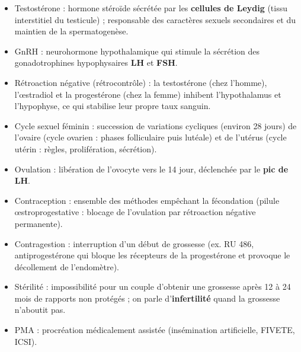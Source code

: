 \documentclass[11pt]{article}
\newcommand{\cle}[1]{{\popxbold\color{popdark}#1}}
\newcounter{popsec}
\newcounter{popsub}
\newcommand{\courssub}[1]{%
  \stepcounter{popsub}%
  \par\vspace{9pt}\noindent{\popxbold\fontsize{11.5}{13}\selectfont\color{popink}{\color{poporange}\thepopsec.\thepopsub}\hspace{6pt}#1}\par\nopagebreak\vspace{4pt}
}
\begin{document}
\courssub{L'essentiel à retenir}

\begin{bilan}
\begin{itemize}
  \item \cle{Testostérone} : hormone stéroïde sécrétée par les \textbf{cellules de Leydig} (tissu interstitiel du testicule) ; responsable des caractères sexuels secondaires et du maintien de la spermatogenèse.
  \item \cle{GnRH} : neurohormone hypothalamique qui stimule la sécrétion des gonadotrophines hypophysaires \textbf{LH} et \textbf{FSH}.
  \item \cle{Rétroaction négative} (rétrocontrôle) : la testostérone (chez l'homme), l'\oe stradiol et la progestérone (chez la femme) inhibent l'hypothalamus et l'hypophyse, ce qui stabilise leur propre taux sanguin.
  \item \cle{Cycle sexuel féminin} : succession de variations cycliques (environ \num{28} jours) de l'ovaire (cycle ovarien : phases folliculaire puis lutéale) et de l'utérus (cycle utérin : règles, prolifération, sécrétion).
  \item \cle{Ovulation} : libération de l'ovocyte vers le \num{14}\ieme{} jour, déclenchée par le \textbf{pic de LH}.
  \item \cle{Contraception} : ensemble des méthodes empêchant la fécondation (pilule \oe stroprogestative : blocage de l'ovulation par rétroaction négative permanente).
  \item \cle{Contragestion} : interruption d'un début de grossesse (ex. RU 486, antiprogestérone qui bloque les récepteurs de la progestérone et provoque le décollement de l'endomètre).
  \item \cle{Stérilité} : impossibilité pour un couple d'obtenir une grossesse après 12 à 24 mois de rapports non protégés ; on parle d'\textbf{infertilité} quand la grossesse n'aboutit pas.
  \item \cle{PMA} : procréation médicalement assistée (insémination artificielle, FIVETE, ICSI).
\end{itemize}
\end{bilan}
\end{document}
